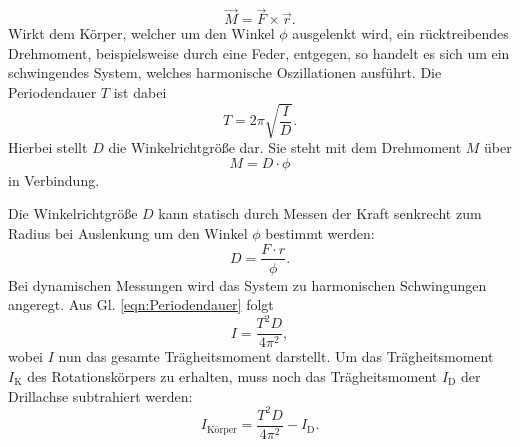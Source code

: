 \begin{equation}
\vec{M} = \vec{F} \times \vec{r}.
\end{equation}
Wirkt dem Körper, welcher um den Winkel $\phi$ ausgelenkt wird,
ein rücktreibendes Drehmoment, beispielsweise durch eine Feder,
entgegen, so handelt es sich um ein schwingendes System, welches
harmonische Oszillationen ausführt. Die Periodendauer $T$ ist dabei
\begin{equation}
T = 2\pi \sqrt{\frac{I}{D}}.
\label{eqn:Periodendauer}
\end{equation}
Hierbei stellt $D$ die Winkelrichtgröße dar. Sie steht mit
dem Drehmoment $M$ über
\begin{equation}
M = D \cdot \phi
\end{equation}
in Verbindung. 
\par
\noindent Die Winkelrichtgröße $D$ kann statisch durch Messen der Kraft
senkrecht zum Radius bei Auslenkung um den Winkel $\phi$
bestimmt werden:
\begin{equation}
\label{eqn:winkelrichtgroeße}
D = \frac{F \cdot r}{\phi}.
\end{equation}
Bei dynamischen Messungen wird das System zu harmonischen
Schwingungen angeregt. Aus Gl. \eqref{eqn:Periodendauer} folgt
\begin{equation*}
I = \frac{T^2D}{4\pi^2},
\end{equation*}
wobei $I$ nun das gesamte Trägheitsmoment darstellt. Um das
Trägheitsmoment $I_{\text{K}}$ des Rotationskörpers zu erhalten,
muss noch das Trägheitsmoment $I_{\text{D}}$ der Drillachse
subtrahiert werden:
\begin{equation}
  \label{eqn:taegheitsmoment}
I_{\text{Körper}} = \frac{T^2D}{4\pi^2} - I_{\text{D}}.
\end{equation}
